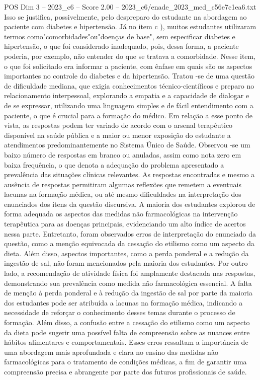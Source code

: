 \begin{textsample}{POS Dim 3 – 2023\_c6 – Score 2.00 – 2023\_c6/enade\_2023\_med\_c56e7c1ea6.txt}
Isso se justifica, possivelmente, pelo despreparo do estudante na abordagem ao paciente com diabetes e hipertensão.
Já no item c ), muitos estudantes utilizaram termos como"comorbidades"ou"doenças de base", sem especificar diabetes e hipertensão, o que foi considerado inadequado, pois, dessa forma, a paciente poderia, por exemplo, não entender do que se tratava a comorbidade.
Nesse item, o que foi solicitado era informar a paciente, com ênfase em quais são os aspectos importantes no controle do diabetes e da hipertensão.
Tratou -se de uma questão de dificuldade mediana, que exigia conhecimentos técnico-científicos e preparo no relacionamento interpessoal, explorando a empatia e a capacidade de dialogar e de se expressar, utilizando uma linguagem simples e de fácil entendimento com a paciente, o que é crucial para a formação do médico.
Em relação a esse ponto de vista, as respostas podem ter variado de acordo com o arsenal terapêutico disponível na saúde pública e a maior ou menor exposição do estudante a atendimentos predominantemente no Sistema Único de Saúde.
Observou -se um baixo número de respostas em branco ou anuladas, assim como nota zero em baixa frequência, o que denota a adequação do problema apresentado a prevalência das situações clínicas relevantes.
As respostas encontradas e mesmo a ausência de respostas permitiram algumas reflexões que remetem a eventuais lacunas na formação médica, ou até mesmo dificuldades na interpretação dos enunciados dos itens da questão discursiva.
A maioria dos estudantes explorou de forma adequada os aspectos das medidas não farmacológicas na intervenção terapêutica para as doenças principais, evidenciando um alto índice de acertos nessa parte.
Entretanto, foram observados erros de interpretação do enunciado da questão, como a menção equivocada da cessação do etilismo como um aspecto da dieta.
Além disso, aspectos importantes, como a perda ponderal e a redução da ingestão de sal, não foram mencionados pela maioria dos estudantes.
Por outro lado, a recomendação de atividade física foi amplamente destacada nas respostas, demonstrando sua prevalência como medida não farmacológica essencial.
A falta de menção à perda ponderal e à redução da ingestão de sal por parte da maioria dos estudantes pode ser atribuída a lacunas na formação médica, indicando a necessidade de reforçar o conhecimento desses temas durante o processo de formação.
Além disso, a confusão entre a cessação do etilismo como um aspecto da dieta pode sugerir uma possível falta de compreensão sobre as nuances entre hábitos alimentares e comportamentais.
Esses erros ressaltam a importância de uma abordagem mais aprofundada e clara no ensino das medidas não farmacológicas para o tratamento de condições médicas, a fim de garantir uma compreensão precisa e abrangente por parte dos futuros profissionais de saúde.

\end{textsample}
